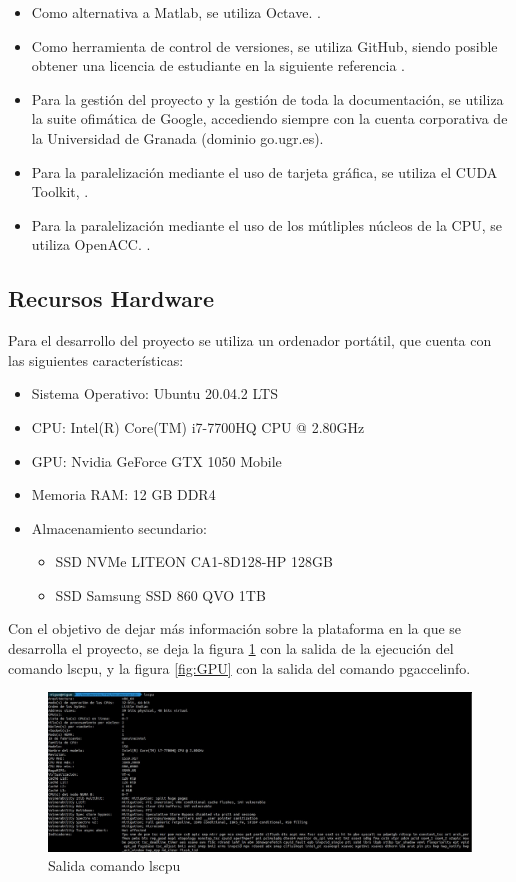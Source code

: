 \begin{itemize}
    \item Como alternativa a Matlab, se utiliza Octave. \cite{unknown-author-2021B}.
    \item Como herramienta de control de versiones, se utiliza GitHub, siendo posible obtener una licencia de estudiante en la siguiente referencia \cite{unknown-author-2021}.
    \item Para la gestión del proyecto y la gestión de toda la documentación, se utiliza la suite ofimática de Google, accediendo siempre con la cuenta corporativa de la Universidad de Granada (dominio go.ugr.es).
    \item Para la paralelización mediante el uso de tarjeta gráfica, se utiliza el CUDA Toolkit, \cite{unknown-author-no-date}.
    \item Para la paralelización mediante el uso de los mútliples núcleos de la CPU, se utiliza OpenACC. \cite{unknown-author-no-dateB}.
\end{itemize}

\subsection{Recursos Hardware}
Para el desarrollo del proyecto se utiliza un ordenador portátil, que cuenta con las siguientes características:

\begin{itemize}
    \item Sistema Operativo: Ubuntu 20.04.2 LTS
    \item CPU: Intel(R) Core(TM) i7-7700HQ CPU @ 2.80GHz
    \item GPU: Nvidia GeForce GTX 1050 Mobile
    \item Memoria RAM: 12 GB DDR4
    \item Almacenamiento secundario:
    \begin{itemize}
        \item SSD NVMe LITEON CA1-8D128-HP 128GB
        \item SSD Samsung SSD 860 QVO 1TB
    \end{itemize} 
\end{itemize}

Con el objetivo de dejar más información sobre la plataforma en la que se desarrolla el proyecto, se deja la figura \ref{fig:CPU} con la salida de la ejecución del comando lscpu, y la figura \ref{fig:GPU} con la salida del comando pgaccelinfo.

\begin{figure}[H]
    \centering
    \includegraphics[width=\textwidth]{img/lscpu.jpeg}
    \caption{Salida comando lscpu}
    \label{fig:CPU}
\end{figure}

